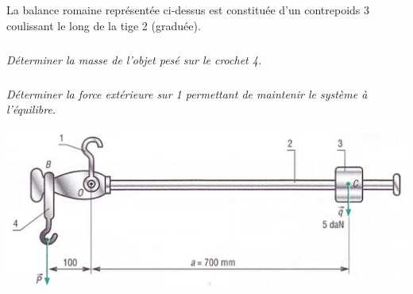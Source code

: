 \documentclass[10pt]{article}
\begin{document}
\begin{minipage}[c]{.5\linewidth}
La balance romaine représentée ci-dessus est constituée d'un contrepoids 3 coulissant le long de la tige 2 (graduée).
\subparagraph*{}
\textit{Déterminer la masse de l'objet pesé sur le crochet 4.}

\subparagraph*{}
\textit{Déterminer la force extérieure sur 1 permettant de maintenir le système à l'équilibre.}

\end{minipage}\hfill
\begin{minipage}[c]{.48\linewidth}
\begin{center}
\includegraphics[width=\textwidth]{images/balance}
\end{center}
\end{minipage}
\end{document}
